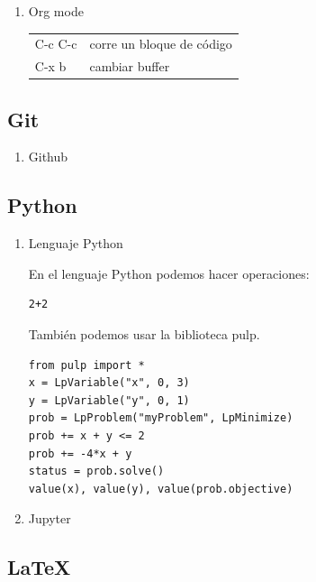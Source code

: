 \documentclass[11pt]{article}
\begin{document}
\begin{enumerate}
\item Org mode
\label{sec:orgf905479}
\begin{center}
\begin{tabular}{ll}
C-c C-c & corre un bloque de código\\
C-x b & cambiar buffer\\
\end{tabular}
\end{center}
\end{enumerate}


\subsection{Git}
\label{sec:org5a5e0cf}
\begin{enumerate}
\item Github
\label{sec:org95891dc}
\end{enumerate}
\subsection{Python}
\label{sec:org1e35462}
\begin{enumerate}
\item Lenguaje Python
\label{sec:org48bc0d8}

En el lenguaje Python podemos hacer operaciones:

\lstset{language=Python,label= ,caption= ,captionpos=b,numbers=none}
\begin{lstlisting}
2+2
\end{lstlisting}

También podemos usar la biblioteca pulp.

\lstset{language=Python,label= ,caption= ,captionpos=b,numbers=none}
\begin{lstlisting}
from pulp import *
x = LpVariable("x", 0, 3)
y = LpVariable("y", 0, 1)
prob = LpProblem("myProblem", LpMinimize)
prob += x + y <= 2
prob += -4*x + y
status = prob.solve()
value(x), value(y), value(prob.objective)
\end{lstlisting}

\item Jupyter
\label{sec:org5d60ecd}
\end{enumerate}
\subsection{\LaTeX{}}
\label{sec:org2f96070}
\end{document}
